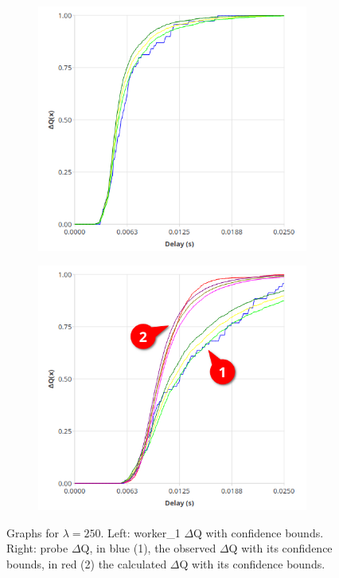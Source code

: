        \begin{figure}[H]
            \centering
            \begin{subfigure}{.5\textwidth}
                \centering
                \includegraphics[width=0.98\textwidth]{img/overload_2/250_worker.png}
                \label{fig:high_load_1}
            \end{subfigure}%
            \begin{subfigure}{.5\textwidth}
                \centering
                \includegraphics[width =0.98\textwidth]{img/overload_2/250_probe2.png}
                \label{fig:high_load_2}
            \end{subfigure}
            \label{fig:early_ov}
            \caption{Graphs for $\lambda = 250$. Left: worker\_1 $\Delta$Q with confidence bounds. \\
            Right: probe $\Delta$Q, in blue (1), the observed $\Delta$Q with its confidence bounds, in red (2) the calculated $\Delta$Q with its confidence bounds.}
        \end{figure}
    
